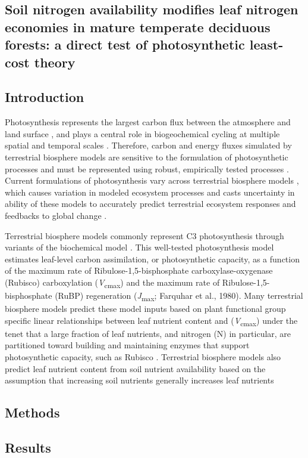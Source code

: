 \begin{singlespace}
    \chapter{\textbf{Soil nitrogen availability modifies leaf nitrogen economies in mature temperate deciduous forests: a direct test of photosynthetic least-cost theory}}
    \end{singlespace}
    
    \section{Introduction}
    
    Photosynthesis represents the largest carbon flux between the atmosphere and land surface , and plays a central role in biogeochemical cycling at multiple spatial and temporal scales . Therefore, carbon and energy fluxes simulated by terrestrial biosphere models are sensitive to the formulation of photosynthetic processes  and must be represented using robust, empirically tested processes . Current formulations of photosynthesis vary across terrestrial biosphere models , which causes variation in modeled ecosystem processes  and casts uncertainty in ability of these models to accurately predict terrestrial ecosystem responses and feedbacks to global change .

    Terrestrial biosphere models commonly represent C3 photosynthesis through variants of the  biochemical model . This well-tested photosynthesis model estimates leaf-level carbon assimilation, or photosynthetic capacity, as a function of the maximum rate of Ribulose-1,5-bisphosphate carboxylase-oxygenase (Rubisco) carboxylation (\textit{V}\textsubscript{cmax}) and the maximum rate of Ribulose-1,5-bisphosphate (RuBP) regeneration (\textit{J}\textsubscript{max}; Farquhar et al., 1980). Many terrestrial biosphere models predict these model inputs based on plant functional group specific linear relationships between leaf nutrient content and (\textit{V}\textsubscript{cmax})  under the tenet that a large fraction of leaf nutrients, and nitrogen (N) in particular, are partitioned toward building and maintaining enzymes that support photosynthetic capacity, such as Rubisco . Terrestrial biosphere models also predict leaf nutrient content from soil nutrient availability based on the assumption that increasing soil nutrients generally increases leaf nutrients 


    \section{Methods}
    
    \section{Results}